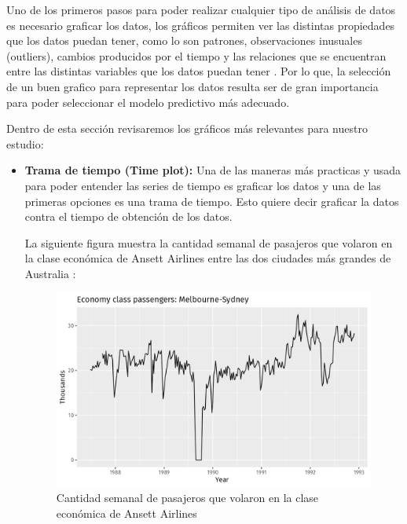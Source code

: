 Uno de los primeros pasos para poder realizar cualquier tipo de análisis de datos es necesario graficar los datos, los gráficos permiten ver las distintas propiedades que los datos puedan tener, como lo son patrones, observaciones inusuales (outliers), cambios producidos por el tiempo y las relaciones que se encuentran entre las distintas variables que los datos puedan tener \cite{forecast-time-series-arima}. Por lo que, la selección de un buen grafico para representar los datos resulta ser de gran importancia para poder seleccionar el modelo predictivo más adecuado.

Dentro de esta sección revisaremos los gráficos más relevantes para nuestro estudio:


\begin{itemize}
    \item \textbf{Trama de tiempo (Time plot):} Una de las maneras más practicas y usada para poder entender las series de tiempo es graficar los datos y una de las primeras opciones es una trama de tiempo. Esto quiere decir graficar la datos contra el tiempo de obtención de los datos.
    
    La siguiente figura muestra la cantidad semanal de pasajeros que volaron en la clase económica de Ansett Airlines entre las dos ciudades más grandes de Australia \cite{forecast-time-series-arima}:

    \begin{figure}[H]
        \begin{minipage}[t]{0.9\textwidth}
            \caption{Cantidad semanal de pasajeros que volaron en la clase económica de Ansett Airlines}
            \label{timeplot}        
        \end{minipage}
    
        \vspace{10pt}
    
        \begin{minipage}[b]{0.9\textwidth}
            \centering
            \includegraphics[width=\textwidth]{img/pasajeros-clase-econ-timeplot.png}        
        \end{minipage}
    

\end{figure}
\end{itemize}
